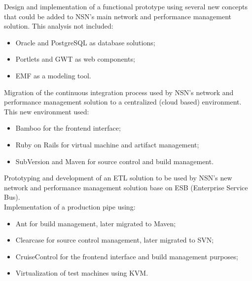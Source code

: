 \documentclass[a4paper,10pt]{memoir} %
\begin{document}

{Design and implementation of a functional prototype using several new concepts that could be added to NSN's main network and performance management solution. This analysis not included:
\begin{itemize}
\item Oracle and PostgreSQL as database solutions;
\item Portlets and GWT as web components;
\item EMF as a modeling tool.
\end{itemize}
}


{Migration of the continuous integration process used by NSN's network and
performance management solution to a centralized (cloud based) environment.
This new environment used:
\begin{itemize}
\item Bamboo for the frontend interface;
\item Ruby on Rails for virtual machine and artifact management;
\item SubVersion and Maven for source control and build management.
\end{itemize}
}


{Prototyping and development of an ETL solution to be used by NSN's new
network and performance management solution base on ESB (Enterprise Service Bus).\\
Implementation of a production pipe using:
\begin{itemize}
\item Ant for build management, later migrated to Maven;
\item Clearcase for source control management, later migrated to SVN;
\item CruiseControl for the frontend interface and build management purposes;
\item Virtualization of test machines using KVM.
\end{itemize}
}

\end{document}
